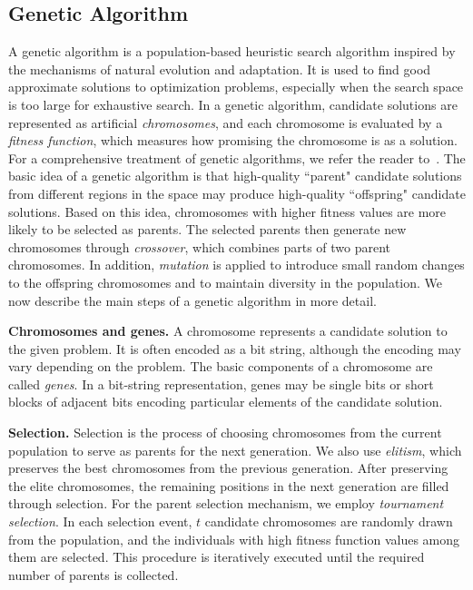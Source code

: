 \documentclass{article}
\begin{document}
\subsection{Genetic Algorithm}
A genetic algorithm is a population-based heuristic search algorithm inspired by the mechanisms of natural evolution and adaptation. It is used to find good approximate solutions to optimization problems, especially when the search space is too large for exhaustive search. In a genetic algorithm, candidate solutions are represented as artificial \textit{chromosomes}, and each chromosome is evaluated by a \textit{fitness function}, which measures how promising the chromosome is as a solution. For a comprehensive treatment of genetic algorithms, we refer the reader to~\cite{goldberg-1989}.
The basic idea of a genetic algorithm is that high-quality ``parent" candidate solutions from different regions in the space may produce high-quality ``offspring" candidate solutions. Based on this idea, chromosomes with higher fitness values are more likely to be selected as parents. The selected parents then generate new chromosomes through \textit{crossover}, which combines parts of two parent chromosomes. In addition, \textit{mutation} is applied to introduce small random changes to the offspring chromosomes and to maintain diversity in the population.
We now describe the main steps of a genetic algorithm in more detail.

\textbf{Chromosomes and genes.}
A chromosome represents a candidate solution to the given problem. It is often encoded as a bit string, although the encoding may vary depending on the problem. The basic components of a chromosome are called \textit{genes}. In a bit-string representation, genes may be single bits or short blocks of adjacent bits encoding particular elements of the candidate solution.

\textbf{Selection.}
Selection is the process of choosing chromosomes from the current population to serve as parents for the next generation. We also use \textit{elitism}, which preserves the best chromosomes from the previous generation. After preserving the elite chromosomes, the remaining positions in the next generation are filled through selection. For the parent selection mechanism, we employ \textit{tournament selection}. In each selection event, $t$ candidate chromosomes are randomly drawn from the population, and the individuals with high fitness function values among them are selected. This procedure is iteratively executed until the required number of parents is collected.
\end{document}
